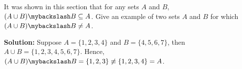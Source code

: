 It was shown in this section that for any sets $A$ and $B$, $(A \cup B) \mybackslash B \subseteq A$. Give an example of two sets $A$ and $B$ for which $(A \cup B) \mybackslash B \neq A$.

\textbf{Solution:} Suppose $A = \{ 1,2,3,4\}$ and $B = \{4,5,6,7\}$, then $A \cup B = \{1,2,3,4,5,6,7\}$.
Hence, $(A \cup B) \mybackslash B = \{1,2,3\} \not\equiv \{1,2,3,4 \} = A$.
\pagebreak